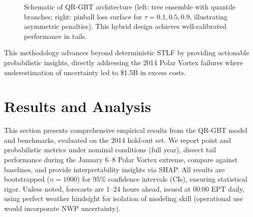 \documentclass[12pt,a4paper]{article}
\begin{document}
\begin{figure}[H]
    \caption{Schematic of QR-GBT architecture (left: tree ensemble with quantile branches; right: pinball loss surface for $\tau=0.1, 0.5, 0.9$, illustrating asymmetric penalties). This hybrid design achieves well-calibrated performance in tails.}
    \label{fig:figure4}
\end{figure}

This methodology advances beyond deterministic STLF by providing actionable probabilistic insights, directly addressing the 2014 Polar Vortex failures where underestimation of uncertainty led to \$1.5B in excess costs.

\section{Results and Analysis}
\label{sec:results}

This section presents comprehensive empirical results from the QR-GBT model and benchmarks, evaluated on the 2014 hold-out set. We report point and probabilistic metrics under nominal conditions (full year), dissect tail performance during the January 6--8 Polar Vortex extreme, compare against baselines, and provide interpretability insights via SHAP. All results are bootstrapped ($n=1000$) for 95\% confidence intervals (CIs), ensuring statistical rigor. Unless noted, forecasts are 1--24 hours ahead, issued at 00:00 EPT daily, using perfect weather hindsight for isolation of modeling skill (operational use would incorporate NWP uncertainty).
\end{document}
